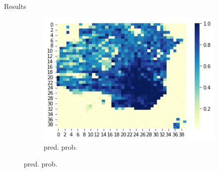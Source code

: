 \documentclass[10pt]{beamer}
\begin{document}
\begin{frame}{Results}
\begin{figure}[!htb]
{\begin{subfigure}{0.32\textwidth}
        \includegraphics[width=1\linewidth, height=0.3\textheight]{pred_theft_prob.png}
        \caption{pred. prob.}
    \end{subfigure}
    }
\end{figure}
\end{frame}
\end{document}
